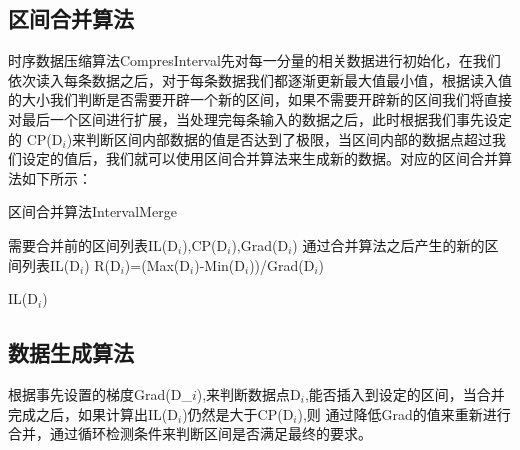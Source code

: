 \subsection{区间合并算法}
\label{section 3.15}
时序数据压缩算法CompresInterval先对每一分量的相关数据进行初始化，在我们依次读入每条数据之后，对于每条数据我们都逐渐更新最大值最小值，根据读入值
的大小我们判断是否需要开辟一个新的区间，如果不需要开辟新的区间我们将直接对最后一个区间进行扩展，当处理完每条输入的数据之后，此时根据我们事先设定的
CP(D$_{i}$)来判断区间内部数据的值是否达到了极限，当区间内部的数据点超过我们设定的值后，我们就可以使用区间合并算法来生成新的数据。对应的区间合并算法如下所示：

\begin{algorithm}
\caption{区间合并算法IntervalMerge}
\label{alg2}
\begin{algorithmic}[1]
\REQUIRE 需要合并前的区间列表IL(D$_{i}$),CP(D$_{i}$),Grad(D$_{i}$) 
\ENSURE 通过合并算法之后产生的新的区间列表IL(D$_{i}$)
\STATE  R(D$_{i}$)=(Max(D$_{i}$)-Min(D$_{i}$))/Grad(D$_{i}$)
\ENDFOR

\ENDWHILE
\RETURN IL(D$_{i}$)
\end{algorithmic}
\end{algorithm}


\subsection{数据生成算法}
\label{section 3.16}

根据事先设置的梯度Grad(D_${i}$),来判断数据点D$_{i}$,能否插入到设定的区间，当合并完成之后，如果计算出IL(D$_{i}$)仍然是大于CP(D$_{i}$),则
通过降低Grad的值来重新进行合并，通过循环检测条件来判断区间是否满足最终的要求。



